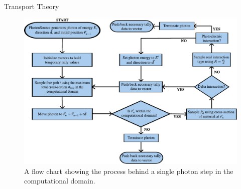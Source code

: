 \documentclass[final]{beamer}
\newlength{\colwidth}
\begin{document}
\begin{frame}[t]
\begin{columns}[t]
\begin{column}{\colwidth}
  \begin{block}{Transport Theory}

    \begin{figure}
      \centering
      \includegraphics[width = 1.0\colwidth]{physics_engine_flow_chart.pdf}
      \caption{A flow chart showing the process behind a single photon step in the computational domain.}
    \end{figure}


\end{block}
\end{column}
\end{columns}
\end{frame}
\end{document}
